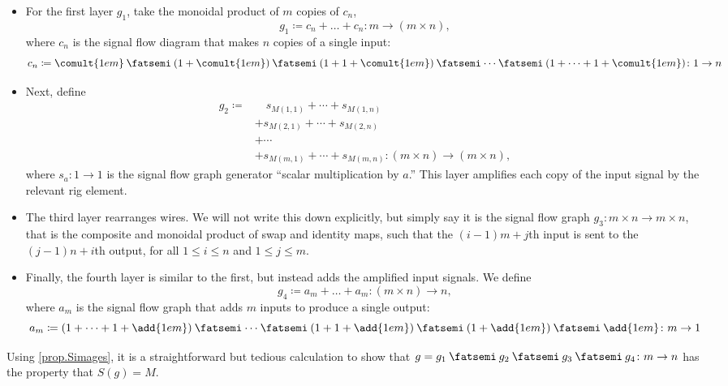 \documentclass[7Sketches]{subfiles}
\begin{document}
{
\begin{itemize}
  \item For the first layer $g_1$, take the monoidal product of $m$ copies of $c_n$,
    \[
      g_1\coloneq c_n +\dots+ c_n\colon m \to (m \times n),
    \]
    where $c_n$ is the signal flow diagram that makes $n$ copies of a single input:
    \[
      c_n\coloneq
      \comult{1em}\cp (1+\comult{1em})\cp (1+1+\comult{1em})\cp \dots\cp (1+\dots+1+\comult{1em})\colon
      1 \to n
    \]
  \item Next, define
    \begin{align*}
      g_2\coloneq &\quad s_{M(1,1)}+\cdots+s_{M(1,n)} \\
      & +s_{M(2,1)}+\cdots+s_{M(2,n)} \\
      &+\cdots \\
      &+s_{M(m,1)}+\cdots+s_{M(m,n)}\colon (m\times n) \to (m\times n),
    \end{align*}
    where $s_a\colon 1 \to 1$ is the signal flow
    graph generator ``scalar multiplication by $a$.'' This layer amplifies each copy of the input signal by the
    relevant rig element.
  \item The third layer rearranges wires. We will not write this down
    explicitly, but simply say it is the signal flow graph $g_3\colon m \times
    n \to m \times n$, that is the
    composite and monoidal product of swap and identity maps, such that the
    $(i-1)m+j$th input is sent to the $(j-1)n+i$th output, for all $1 \le i \le n$
    and $1 \le j \le m$.
  \item Finally, the fourth layer is similar to the first, but instead adds the
    amplified input signals. We define 
    \[
      g_4\coloneq a_m+\dots+a_m \colon (m \times n)\to n,
    \]
    where $a_m$ is the signal flow graph that adds $m$ inputs to produce a single output:
    \[
      a_m\coloneq
      (1+\dots+1+\add{1em})\cp \cdots\cp(1+1+\add{1em})\cp(1+\add{1em})\cp\add{1em}\colon
      m \to 1
    \]
\end{itemize}
Using \cref{prop.Simages}, it is a straightforward but tedious calculation to show that $g=g_1\cp g_2\cp g_3\cp g_4\colon m \to n$ has the property that $S(g)=M$.
}
\end{document}
